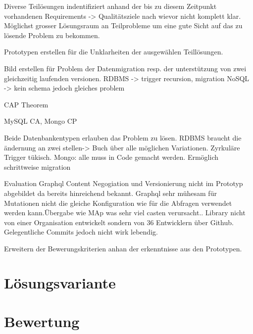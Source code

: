 Diverse Teilösungen indentifiziert anhand der bis zu diesem Zeitpunkt vorhandenen Requirements -> Qualitätsziele nach wievor nicht komplett klar.
Möglichst grosser Lösungsraum an Teilprobleme um eine gute Sicht auf das zu lösende Problem zu bekommen.






Prototypen erstellen für die Unklarheiten der ausgewählen Teillösungen.

Bild erstellen für Problem der Datenmigration resp. der unterstützung von zwei gleichzeitig laufenden versionen.
RDBMS -> trigger recursion, migration
NoSQL -> kein schema jedoch gleiches problem

CAP Theorem

MySQL CA, Mongo CP

Beide Datenbankentypen erlauben das Problem zu lösen. RDBMS braucht die ändernung an zwei stellen-> Buch über alle möglichen Variationen. Zyrkuläre Trigger tükisch. Mongo: alle muss in Code gemacht werden. Ermöglich schrittweise migration


Evaluation Graphql
Content Negogiation und Versionierung nicht im Prototyp abgebildet da bereits hinreichend bekannt.
Graphql sehr mühesam für Mutationen nicht die gleiche Konfiguration wie für die Abfragen verwendet werden kann.Übergabe wie MAp was sehr viel casten verursacht.. Library nicht von einer Organisation entwickelt sondern von 36 Entwicklern über Github. Gelegentliche Commits jedoch nicht wirk lebendig. 

Erweitern der Bewerungskriterien anhan der erkenntnisse aus den Prototypen.

\section{Lösungsvariante}

\section{Bewertung}











